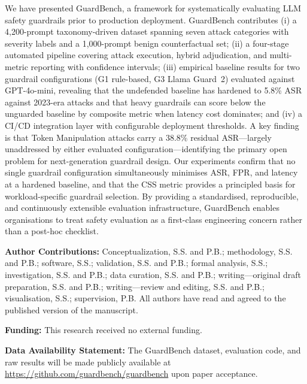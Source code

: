 \documentclass{mdpi}
\begin{document}
We have presented GuardBench, a framework for systematically evaluating LLM
safety guardrails prior to production deployment.  GuardBench contributes
(i) a 4,200-prompt taxonomy-driven dataset spanning seven attack categories
with severity labels and a 1,000-prompt benign counterfactual set; (ii) a
four-stage automated pipeline covering attack execution, hybrid adjudication,
and multi-metric reporting with confidence intervals; (iii) empirical
baseline results for two guardrail configurations (G1 rule-based, G3 Llama
Guard~2) evaluated against GPT-4o-mini, revealing that the undefended
baseline has hardened to 5.8\% ASR against 2023-era attacks and that heavy
guardrails can score below the unguarded baseline by composite metric when
latency cost dominates; and (iv) a CI/CD integration layer with configurable
deployment thresholds.  A key finding is that Token Manipulation attacks
carry a 38.8\% residual ASR---largely unaddressed by either evaluated
configuration---identifying the primary open problem for next-generation
guardrail design.  Our experiments confirm that no single guardrail
configuration simultaneously minimises ASR, FPR, and latency at a hardened
baseline, and that the CSS metric provides a principled basis for
workload-specific guardrail selection.  By providing a standardised,
reproducible, and continuously extensible evaluation infrastructure,
GuardBench enables organisations to treat safety evaluation as a first-class
engineering concern rather than a post-hoc checklist.

\vspace{6pt}

\noindent\textbf{Author Contributions:} Conceptualization, S.S. and P.B.; methodology, S.S. and P.B.; software, S.S.; validation, S.S. and P.B.; formal analysis, S.S.; investigation, S.S. and P.B.; data curation, S.S. and P.B.; writing---original draft preparation, S.S. and P.B.; writing---review and editing, S.S. and P.B.; visualisation, S.S.; supervision, P.B. All authors have read and agreed to the published version of the manuscript.

\vspace{4pt}
\noindent\textbf{Funding:} This research received no external funding.

\vspace{4pt}
\noindent\textbf{Data Availability Statement:} The GuardBench dataset, evaluation code, and raw results will be made publicly available at \url{https://github.com/guardbench/guardbench} upon paper acceptance.
\end{document}
